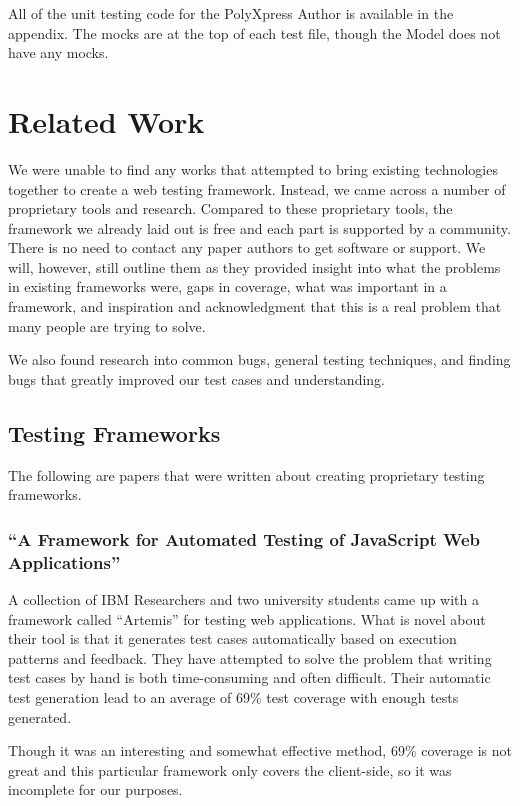 \documentclass[12pt]{ucthesis}
\begin{document}
All of the unit testing code for the PolyXpress Author is available in the appendix. The mocks are at the top of each test file, though the Model does not have any mocks.

\chapter{Related Work}
We were unable to find any works that attempted to bring existing technologies together to create a web testing framework. Instead, we came across a number of proprietary tools and research. Compared to these proprietary tools, the framework we already laid out is free and each part is supported by a community. There is no need to contact any paper authors to get software or support. We will, however, still outline them as they provided insight into what the problems in existing frameworks were, gaps in coverage, what was important in a framework, and inspiration and acknowledgment that this is a real problem that many people are trying to solve.

We also found research into common bugs, general testing techniques, and finding bugs that greatly improved our test cases and understanding.

\section{Testing Frameworks}
The following are papers that were written about creating proprietary testing frameworks.

\subsection{``A Framework for Automated Testing of JavaScript Web Applications''}
A collection of IBM Researchers and two university students came up with a framework called ``Artemis'' for testing web applications\cite{FrameworkForAutomatedTesting}. What is novel about their tool is that it generates test cases automatically based on execution patterns and feedback. They have attempted to solve the problem that writing test cases by hand is both time-consuming and often difficult. Their automatic test generation lead to an average of 69\% test coverage with enough tests generated.

Though it was an interesting and somewhat effective method, 69\% coverage is not great and this particular framework only covers the client-side, so it was incomplete for our purposes.
\end{document}
